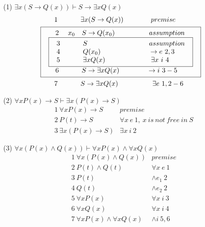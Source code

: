 \documentclass[a4paper,10pt]{article}
\begin{document}
\begin{enumerate}
	\item[(1)]	%
		$\exists x(S\to Q(x))\vdash S\to\exists x Q(x)$ \\
	\begin{align*}
		&\quad\quad 1\ \quad\quad\quad\exists x(S\to Q(x)) \quad\quad\quad\quad premise \\
		&\fbox{
			$\begin{array}{l}
			\quad 2\ \quad x_0 \quad S\to Q(x_0) \quad\quad\quad\quad\quad assumption\\
	 			\fbox{
	 				$\begin{array}{l}
					3\ \quad\quad\quad S \quad\quad\quad\quad\quad\quad\quad\quad\quad assumption\\
					4\ \quad\quad\quad Q(x_0) \quad\quad\quad\quad\quad\quad\quad \to e\ 2,3 \\
					5\ \quad\quad\quad \exists x Q(x)  \ \ \quad\quad\quad\quad\quad\quad \exists x\ i\ 4 \\
		 			\end{array}$
				} \\
			\quad 6\ \quad\quad\quad S\to \exists x Q(x) \quad\quad\quad\quad \to i\ 3-5 \\
	 		\end{array}$
 		} \\
 		&\quad\quad 7\ \quad\quad\quad S\to\exists x Q(x) \quad\quad\quad\quad\quad \exists e\ 1,2-6 \\
	\end{align*}
	
	\item[(2)]	%
		$\forall x P(x)\to S\vdash\exists x(P(x)\to S)$ \\
	\begin{align*}
		&1\ \forall x P(x)\to S 	&premise \\
		&2\ P(t)\to S 			&\forall x\ e\ 1,\ x\ is\ not\ free\ in\ S \\
		&3\ \exists x(P(x)\to S)	&\exists x\ i\ 2
	\end{align*}
	
	\newpage 	%
	
	\item[(3)]	%
		$\forall x(P(x)\land Q(x))\vdash\forall x P(x)\land\forall x Q(x)$ \\
	\begin{align*}
		&1\ \forall x(P(x)\land Q(x)) 	&premise \\
		&2\ P(t)\land Q(t) 				&\forall x\ e\ 1 \\
		&3\ P(t)						&\land e_1\ 2 \\
		&4\ Q(t)						&\land e_2\ 2 \\
		&5\ \forall x P(x)				&\forall x\ i\ 3 \\
		&6\ \forall x Q(x)				&\forall x\ i\ 4 \\
		&7\ \forall x P(x)\land\forall x Q(x)	&\land i\ 5,6 \\
	\end{align*}
	

\end{enumerate}
\end{document}
